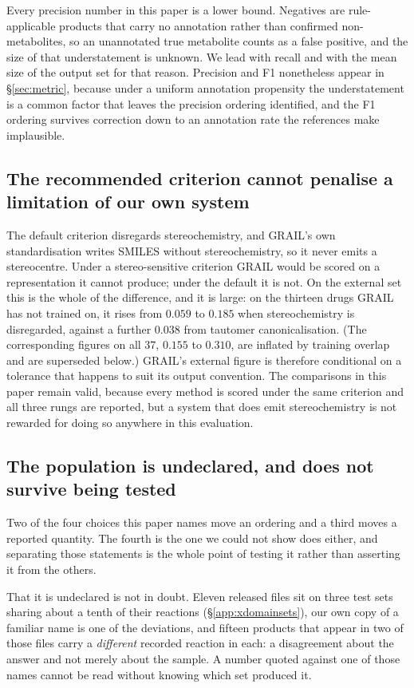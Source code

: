 Every precision number in this paper is a lower bound. Negatives are rule-applicable products
that carry no annotation rather than confirmed non-metabolites, so an unannotated true metabolite
counts as a false positive, and the size of that understatement is unknown. We lead with recall and
with the mean size of the output set for that reason. Precision and F1 nonetheless appear in
\S\ref{sec:metric}, because under a uniform annotation propensity the understatement is a common
factor that leaves the precision ordering identified, and the F1 ordering survives correction down
to an annotation rate the references make implausible.

\subsection{The recommended criterion cannot penalise a limitation of our own system}

The default criterion disregards stereochemistry, and GRAIL's own standardisation writes SMILES
without stereochemistry, so it never emits a stereocentre. Under a stereo-sensitive criterion GRAIL
would be scored on a representation it cannot produce; under the default it is not. On the external
set this is the whole of the difference, and it is large: on the thirteen drugs GRAIL has not
trained on, it rises from $0.059$ to $0.185$ when stereochemistry is disregarded, against a further
$0.038$ from tautomer canonicalisation. (The corresponding figures on all $37$, $0.155$ to $0.310$,
are inflated by training overlap and are superseded below.) GRAIL's external figure is therefore conditional on a tolerance that happens to suit its output
convention. The comparisons in this paper remain valid, because every method is scored
under the same criterion and all three rungs are reported, but a system that does emit
stereochemistry is not rewarded for doing so anywhere in this evaluation.

\subsection{The population is undeclared, and does not survive being tested}
\label{app:popaxis}

Two of the four choices this paper names move an ordering and a third moves a reported quantity.
The fourth is the one we could not show does either, and separating those statements is the whole
point of testing it rather than asserting it from the others.

That it is undeclared is not in doubt. Eleven released files sit on three test sets sharing about a
tenth of their reactions (\S\ref{app:xdomainsets}), our own copy of a familiar name is one of the
deviations, and fifteen products that appear in two of those files carry a \emph{different} recorded
reaction in each: a disagreement about the answer and not merely about the sample. A number
quoted against one of those names cannot be read without knowing which set produced it.

